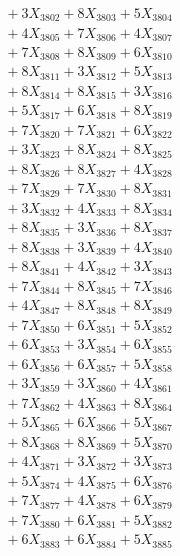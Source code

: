 \documentclass[a4paper,10pt]{article}
\begin{document}
{\begin{align}
&\;  + 3 X_{3802} + 8 X_{3803} + 5 X_{3804} \\[0.3ex]
&\;  + 4 X_{3805} + 7 X_{3806} + 4 X_{3807} \\[0.3ex]
&\;  + 7 X_{3808} + 8 X_{3809} + 6 X_{3810} \\[0.3ex]
&\;  + 8 X_{3811} + 3 X_{3812} + 5 X_{3813} \\[0.3ex]
&\;  + 8 X_{3814} + 8 X_{3815} + 3 X_{3816} \\[0.3ex]
&\;  + 5 X_{3817} + 6 X_{3818} + 8 X_{3819} \\[0.5ex]\allowbreak
&\;  + 7 X_{3820} + 7 X_{3821} + 6 X_{3822} \\[0.3ex]
&\;  + 3 X_{3823} + 8 X_{3824} + 8 X_{3825} \\[0.3ex]
&\;  + 8 X_{3826} + 8 X_{3827} + 4 X_{3828} \\[0.3ex]
&\;  + 7 X_{3829} + 7 X_{3830} + 8 X_{3831} \\[0.3ex]
&\;  + 3 X_{3832} + 4 X_{3833} + 8 X_{3834} \\[0.3ex]
&\;  + 8 X_{3835} + 3 X_{3836} + 8 X_{3837} \\[0.3ex]
&\;  + 8 X_{3838} + 3 X_{3839} + 4 X_{3840} \\[0.3ex]
&\;  + 8 X_{3841} + 4 X_{3842} + 3 X_{3843} \\[0.3ex]
&\;  + 7 X_{3844} + 8 X_{3845} + 7 X_{3846} \\[0.3ex]
&\;  + 4 X_{3847} + 8 X_{3848} + 8 X_{3849} \\[0.5ex]\allowbreak
&\;  + 7 X_{3850} + 6 X_{3851} + 5 X_{3852} \\[0.3ex]
&\;  + 6 X_{3853} + 3 X_{3854} + 6 X_{3855} \\[0.3ex]
&\;  + 6 X_{3856} + 6 X_{3857} + 5 X_{3858} \\[0.3ex]
&\;  + 3 X_{3859} + 3 X_{3860} + 4 X_{3861} \\[0.3ex]
&\;  + 7 X_{3862} + 4 X_{3863} + 8 X_{3864} \\[0.3ex]
&\;  + 5 X_{3865} + 6 X_{3866} + 5 X_{3867} \\[0.3ex]
&\;  + 8 X_{3868} + 8 X_{3869} + 5 X_{3870} \\[0.3ex]
&\;  + 4 X_{3871} + 3 X_{3872} + 3 X_{3873} \\[0.3ex]
&\;  + 5 X_{3874} + 4 X_{3875} + 6 X_{3876} \\[0.3ex]
&\;  + 7 X_{3877} + 4 X_{3878} + 6 X_{3879} \\[0.5ex]\allowbreak
&\;  + 7 X_{3880} + 6 X_{3881} + 5 X_{3882} \\[0.3ex]
&\;  + 6 X_{3883} + 6 X_{3884} + 5 X_{3885} \\[0.3ex]

\end{align}}
\end{document}
